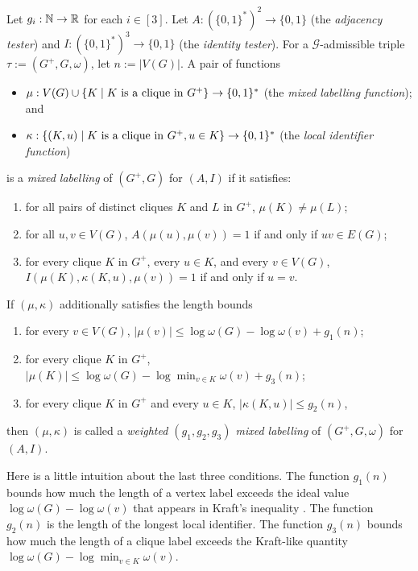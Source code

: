 \documentclass{patmorin}
\renewcommand{\le}{\leqslant}
\newcommand{\defin}[1]{\emph{\textcolor{brightmaroon}{#1}}}
\DeclarePairedDelimiter{\set}{\{}{\}}
\newcommand{\calG}{\mathcal{G}}
\begin{document}
Let $g_i:\mathbb{N}\to\mathbb{R}$ for each $i\in[3]$.
Let $A:(\{0,1\}^*)^2\to\{0,1\}$ (the \defin{adjacency tester}) and $I:(\{0,1\}^*)^3\to\{0,1\}$ (the \defin{identity tester}).
For a $\calG$-admissible triple $\tau:=(G^+,G,\omega)$, let $n:=|V(G)|$.
A pair of functions
\begin{itemize}[nosep,nolistsep]
  \item $\mu: V(G)\cup \{K\mid \text{$K$ is a clique in $G^+$}\} \to \set{0,1}^*$ (the \defin{mixed labelling function}); and 
  \item $\kappa:\{(K, u)\mid \text{$K$ is a clique in $G^+$}, u\in K\}\to \set{0,1}^*$ (the \defin{local identifier function})
\end{itemize} 
is a \defin{mixed labelling} of $(G^+,G)$ for $(A,I)$ if it satisfies:
\begin{enumerate}[nosep,nolistsep,label=(M\arabic*)]
  \item\label{mls:injective_on_cliques} for all pairs of distinct cliques $K$ and $L$ in $G^+$, $\mu(K)\neq\mu(L)$;
  \item\label{mls:adjacency_tester} for all $u,v\in V(G)$, $A(\mu(u),\mu(v))=1$ if and only if $uv\in E(G)$;
  \item\label{mls:identity_tester} for every clique $K$ in $G^+$, every $u\in K$, and every $v\in V(G)$, $I(\mu(K),\kappa(K, u),\mu(v))=1$ if and only if $u=v$.
\end{enumerate}
If $(\mu,\kappa)$ additionally satisfies the length bounds
\begin{enumerate}[resume,nosep,nolistsep,label=(M\arabic*)]
  \item\label{mls:vertex_label_length} for every $v\in V(G)$, $|\mu(v)| \le \log \omega(G) - \log\omega(v) + g_1(n)$;
  \item\label{mls:clique_label_length} for every clique $K$ in $G^+$, $|\mu(K)|\le \log \omega(G) - \log\min_{v\in K}\omega(v) + g_3(n)$;
  \item\label{mls:local_identifier_length}  for every clique $K$ in $G^+$ and every $u\in K$, $|\kappa(K, u)| \le g_2(n)$,
\end{enumerate}
then $(\mu,\kappa)$ is called a \defin{weighted $(g_1,g_2,g_3)$ mixed labelling} of $(G^+,G,\omega)$ for $(A,I)$.  

Here is a little intuition about the last three conditions. The function $g_1(n)$ bounds how much the length of a vertex label exceeds the ideal value $\log \omega(G) - \log\omega(v)$ that appears in Kraft's inequality \citep{Kraft1949}. The function $g_2(n)$ is the length of the longest local identifier. The function $g_3(n)$ bounds how much the length of a clique label exceeds the Kraft-like quantity $\log\omega(G)-\log\min_{v\in K}\omega(v)$.
\end{document}
